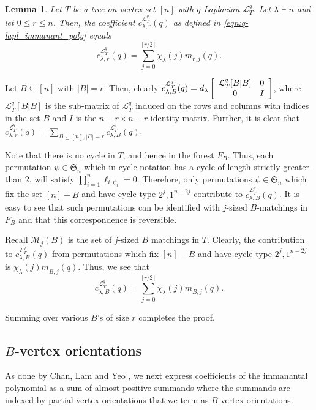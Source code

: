 \documentclass[12pt]{article}
\def\eod{\vrule height 6pt width 5pt depth 0pt}
\newenvironment{proof}{\noindent {\bf Proof:} \hspace{.2em}}
                      {\hspace*{\fill}{\eod}}
\newtheorem{lemma}[theorem]{Lemma}
\newcommand{\sL}{  \mathcal{ L}}
\newcommand{\sM}{  \mathcal{ M}}
\newcommand{\rhalf}{\lfloor r/2 \rfloor}
\newcommand{\SSS}{\mathfrak{S}}
\begin{document}
\begin{lemma}
\label{lem:coeff_in_m_rj}
Let $T$ be a tree on vertex set $[n]$ with $q$-Laplacian $\sL_T^q$.  
Let $\lambda \vdash n$
and let $0 \leq r \leq n$. Then, the coefficient $c_{\lambda,r}^{\sL_T^q}(q)$ 
as defined in \eqref{eqn:q-lapl_immanant_poly} equals
\begin{equation*}
  c_{\lambda,r}^{\sL_T^q}(q) = \sum\limits_{j=0}^{\rhalf} \chi_{\lambda}^{}(j)m_{r,j}^{}(q).
\end{equation*}
\end{lemma}



\begin{proof}
Let $B\subseteq [n]$ with $|B|=r$. Then, clearly
$ 
 c_{\lambda,B}^{\sL_T^q}(q)=d_{\lambda}
 \left[
 \begin{array}{c c} 
 \sL_T^q[B|B] & 0 \\
 0 & I
 \end{array}
 \right]$, 
where $\sL_T^q[B|B]$ is the sub-matrix of $\sL_{T}^q$ 
induced on the rows and columns with indices in the set $B$ and 
$I$ is the $n-r \times n-r$ identity matrix. Further,
it is clear that $c_{\lambda,r}^{\sL_T^q}(q) = 
\sum_{B \subseteq [n], |B| = r} c_{\lambda,B}^{\sL_T^q}(q)$.

Note that there is no cycle in $T$, and hence
in the forest $F_B$. 
Thus, each permutation $\psi \in \SSS_n$ which
in cycle notation has a cycle of length strictly greater than $2$, 
will satisfy $\prod_{i=1}^n \ell_{i,\psi_i}=0$. 
Therefore, only permutations $\psi \in \SSS_n$ 
which fix the set $[n]-B$ and have cycle type
$2^j, 1^{n-2j}$  contribute to $c_{\lambda,B}^{\sL_T^q}(q)$.  
It is easy to see that such permutations 
can be identified with $j$-sized $B$-matchings in $F_B$ 
and that  this correspondence is reversible. 

 Recall $\sM_j(B)$ is the set of $j$-sized $B$ matchings in $T$.  
Clearly, the contribution to $c_{\lambda,B}^{\sL_T^q}(q)$ from
permutations which fix $[n]-B$ and have cycle-type $2^j, 1^{n-2j}$ 
is $\chi_{\lambda}^{ }(j) m_{B,j}^{}(q)$.
Thus, we see that
\begin{equation}
\label{eq:coeff_c_in_B} 
c_{\lambda,B}^{\sL_T^q}(q) 
= \sum_{j=0}^{\rhalf} \chi_{\lambda}^{ }(j) m_{B,j}^{}(q).
\end{equation}

Summing over various $B$'s of size $r$ completes the proof.
\end{proof}

\subsection{$B$-vertex orientations}
As done by Chan, Lam and Yeo \cite{chan_lam_yeo}, we next express coefficients 
of the immanantal polynomial as a sum of almost positive summands where
the summands are indexed by partial vertex orientations that
we term as $B$-vertex orientations.
\end{document}
